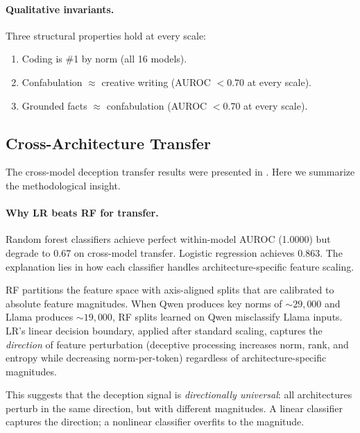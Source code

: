\paragraph{Qualitative invariants.} Three structural properties hold at every scale:
\begin{enumerate}[leftmargin=*]
    \item Coding is \#1 by norm (all 16 models).
    \item Confabulation $\approx$ creative writing (AUROC $< 0.70$ at every scale).
    \item Grounded facts $\approx$ confabulation (AUROC $< 0.70$ at every scale).
\end{enumerate}

\subsection{Cross-Architecture Transfer}
\label{sec:transfer}

The cross-model deception transfer results were presented in . Here we summarize the methodological insight.

\paragraph{Why LR beats RF for transfer.} Random forest classifiers achieve perfect within-model AUROC (1.0000) but degrade to 0.67 on cross-model transfer. Logistic regression achieves 0.863. The explanation lies in how each classifier handles architecture-specific feature scaling.

RF partitions the feature space with axis-aligned splits that are calibrated to absolute feature magnitudes. When Qwen produces key norms of ${\sim}29{,}000$ and Llama produces ${\sim}19{,}000$, RF splits learned on Qwen misclassify Llama inputs. LR's linear decision boundary, applied after standard scaling, captures the \emph{direction} of feature perturbation (deceptive processing increases norm, rank, and entropy while decreasing norm-per-token) regardless of architecture-specific magnitudes.

This suggests that the deception signal is \emph{directionally universal}: all architectures perturb in the same direction, but with different magnitudes. A linear classifier captures the direction; a nonlinear classifier overfits to the magnitude.
